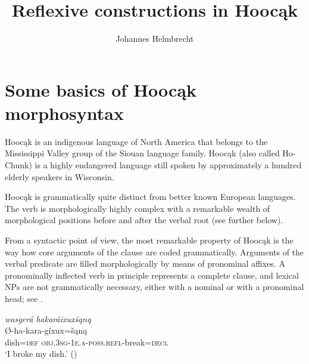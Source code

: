 \documentclass[output=paper]{langscibook}
\author{Johannes Helmbrecht \affiliation{University of Regensburg, Germany}}
\title{Reflexive constructions in Hoocąk}
\begin{document}
\maketitle


\section{Some basics of Hoocąk morphosyntax}\label{sec:Helmbrecht:1}

Hoocąk is an indigenous language of North America that belongs to the Mississippi Valley group of the Siouan language family. Hoocąk (also called Ho-Chunk) is a highly endangered language still spoken by approximately a hundred elderly speakers in Wisconsin. 

Hoocąk is grammatically quite distinct from better known European languages. The verb is morphologically highly complex with a remarkable wealth of morphological positions before and after the verbal root (see further below).

From a syntactic point of view, the most remarkable property of Hoocąk is the way how core arguments of the clause are coded grammatically. Arguments of the verbal predicate are filled morphologically by means of pronominal affixes. A pronominally inflected verb in principle represents a complete clause, and lexical NPs are not grammatically necessary, either with a nominal or with a pronominal head; see .


\ea \label{ex:Helmbrecht:1} 
  \textit{wasgerá hakaráixuxšąną }\\  
 	   {Ø-ha-kara-gíxux=šąną}\\	
 	{dish=\textsc{def}} {\textsc{obj.3sg}-1\textsc{e.a}-\textsc{poss.refl}-break=\textsc{decl}}\\
  \glt `I broke my dish.' (\citealt[14]{Eagle1988})
\z 
\end{document}

